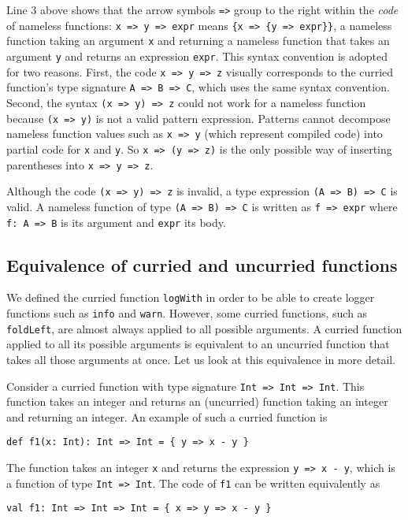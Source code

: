 Line 3 above shows that the arrow symbols \lstinline!=>! group to
the right within the \emph{code} of nameless functions: \lstinline!x => y => expr!
means \lstinline!{x => {y => expr}}!, a nameless function taking
an argument \lstinline!x! and returning a nameless function that
takes an argument \lstinline!y! and returns an expression \lstinline!expr!.
This syntax convention is adopted for two reasons. First, the code
\lstinline!x => y => z! visually corresponds to the curried function's
type signature \lstinline!A => B => C!, which uses the same syntax
convention. Second, the syntax \lstinline!(x => y) => z! could not
work for a nameless function because \lstinline!(x => y)! is not
a valid pattern expression. Patterns cannot decompose nameless function
values such as \lstinline!x => y! (which represent compiled code)
into partial code for \lstinline!x! and \lstinline!y!. So \lstinline!x => (y => z)!
is the only possible way of inserting parentheses into \lstinline!x => y => z!.

Although the code \lstinline!(x => y) => z! is invalid, a type expression
\lstinline!(A => B) => C! is valid. A nameless function of type \lstinline!(A => B) => C!
is written as \lstinline!f => expr! where \lstinline!f: A => B!
is its argument and \lstinline!expr! its body. 

\subsection{Equivalence of curried and uncurried functions}

We defined the curried function \lstinline!logWith! in order to be
able to create logger functions such as \lstinline!info! and \lstinline!warn!.
However, some curried functions, such as \lstinline!foldLeft!, are
almost always applied to all possible arguments. A curried function
applied to all its possible arguments is equivalent to an uncurried
function that takes all those arguments at once. Let us look at this
equivalence in more detail.

Consider a curried function with type signature \lstinline!Int => Int => Int!.
This function takes an integer and returns an (uncurried) function
taking an integer and returning an integer. An example of such a curried
function is
\begin{lstlisting}
def f1(x: Int): Int => Int = { y => x - y }
\end{lstlisting}

The function takes an integer \lstinline!x! and returns the expression
\lstinline!y => x - y!, which is a function of type \lstinline!Int => Int!.
The code of \lstinline!f1! can be written equivalently as
\begin{lstlisting}
val f1: Int => Int => Int = { x => y => x - y }
\end{lstlisting}

